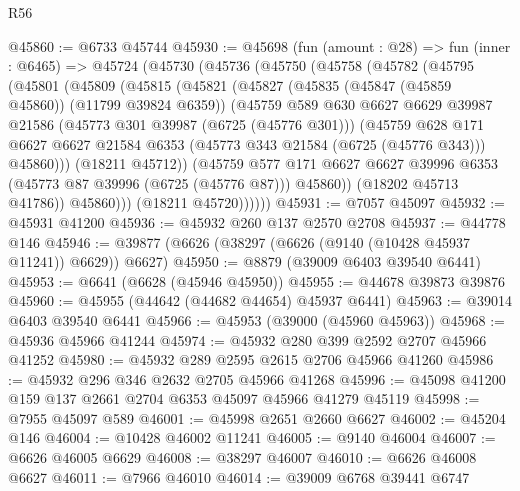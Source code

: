 \begin{lexlean}{R56}
\begin{coremodule}
@45860 := @6733 @45744
@45930 := @45698
    (fun (amount : @28) =>
    fun (inner : @6465) =>
    @45724
      (@45730
        (@45736
          (@45750
            (@45758
              (@45782
                (@45795
                  (@45801
                    (@45809
                      (@45815
                        (@45821
                          (@45827
                            (@45835 (@45847 (@45859 @45860)) (@11799 @39824 @6359))
                            (@45759
                              @589
                              @630
                              @6627
                              @6629
                              @39987
                              @21586
                              (@45773 @301 @39987 (@6725 (@45776 @301)))
                              (@45759
                                @628
                                @171
                                @6627
                                @6627
                                @21584
                                @6353
                                (@45773 @343 @21584 (@6725 (@45776 @343)))
                                @45860)))
                          (@18211 @45712))
                        (@45759
                          @577
                          @171
                          @6627
                          @6627
                          @39996
                          @6353
                          (@45773 @87 @39996 (@6725 (@45776 @87)))
                          @45860))
                      (@18202 @45713 @41786))
                    @45860)))
              (@18211 @45720))))))
@45931 := @7057 @45097
@45932 := @45931 @41200
@45936 := @45932 @260 @137 @2570 @2708
@45937 := @44778 @146
@45946 := @39877 (@6626 (@38297 (@6626 (@9140 (@10428 @45937 @11241)) @6629)) @6627)
@45950 := @8879 (@39009 @6403 @39540 @6441)
@45953 := @6641 (@6628 (@45946 @45950))
@45955 := @44678 @39873 @39876
@45960 := @45955 (@44642 (@44682 @44654) @45937 @6441)
@45963 := @39014 @6403 @39540 @6441
@45966 := @45953 (@39000 (@45960 @45963))
@45968 := @45936 @45966 @41244
@45974 := @45932 @280 @399 @2592 @2707 @45966 @41252
@45980 := @45932 @289 @2595 @2615 @2706 @45966 @41260
@45986 := @45932 @296 @346 @2632 @2705 @45966 @41268
@45996 := @45098 @41200 @159 @137 @2661 @2704 @6353 @45097 @45966 @41279 @45119
@45998 := @7955 @45097 @589
@46001 := @45998 @2651 @2660 @6627
@46002 := @45204 @146
@46004 := @10428 @46002 @11241
@46005 := @9140 @46004
@46007 := @6626 @46005 @6629
@46008 := @38297 @46007
@46010 := @6626 @46008 @6627
@46011 := @7966 @46010
@46014 := @39009 @6768 @39441 @6747

\end{coremodule}
\end{lexlean}
